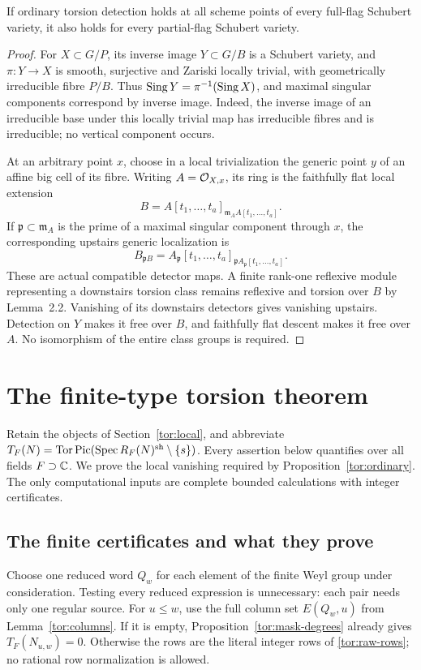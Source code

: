\begin{proposition}\label{tor:partial}
If ordinary torsion detection holds at all scheme points of every full-flag Schubert variety, it also holds for every partial-flag Schubert variety.
\end{proposition}
\begin{proof}
For $X\subset G/P$, its inverse image $Y\subset G/B$ is a Schubert variety, and $\pi:Y\longrightarrow X$ is smooth, surjective and Zariski locally trivial, with geometrically irreducible fibre $P/B$. Thus $\operatorname{Sing} Y=\pi^{-1}(\operatorname{Sing} X)$, and maximal singular components correspond by inverse image. Indeed, the inverse image of an irreducible base under this locally trivial map has irreducible fibres and is irreducible; no vertical component occurs.

At an arbitrary point $x$, choose in a local trivialization the generic point $y$ of an affine big cell of its fibre. Writing $A=\mathcal O_{X,x}$, its ring is the faithfully flat local extension
\[
 B=A[t_1,\ldots,t_a]_{\mathfrak m_AA[t_1,\ldots,t_a]}.
\]
If $\mathfrak p\subset\mathfrak m_A$ is the prime of a maximal singular component through $x$, the corresponding upstairs generic localization is
\[
 B_{\mathfrak pB}
 =A_{\mathfrak p}[t_1,\ldots,t_a]_{\mathfrak pA_{\mathfrak p}[t_1,\ldots,t_a]}.
\]
These are actual compatible detector maps. A finite rank-one reflexive module representing a downstairs torsion class remains reflexive and torsion over $B$ by Lemma~2.2. Vanishing of its downstairs detectors gives vanishing upstairs. Detection on $Y$ makes it free over $B$, and faithfully flat descent makes it free over $A$. No isomorphism of the entire class groups is required.
\end{proof}

\section{The finite-type torsion theorem}\label{tor:finite}

Retain the objects of Section~\ref{tor:local}, and abbreviate $T_F(N)=\operatorname{Tor}\operatorname{Pic}(\operatorname{Spec} R_F(N)^{\mathrm{sh}}\setminus\{s\})$. Every assertion below quantifies over all fields $F\supset\mathbb C$. We prove the local vanishing required by Proposition~\ref{tor:ordinary}. The only computational inputs are complete bounded calculations with integer certificates.

\subsection{The finite certificates and what they prove}
Choose one reduced word $Q_w$ for each element of the finite Weyl group under consideration. Testing every reduced expression is unnecessary: each pair needs only one regular source. For $u\le w$, use the full column set $E(Q_w,u)$ from Lemma~\ref{tor:columns}. If it is empty, Proposition~\ref{tor:mask-degrees} already gives $T_F(N_{u,w})=0$. Otherwise the rows are the literal integer rows of \eqref{tor:raw-rows}; no rational row normalization is allowed.

